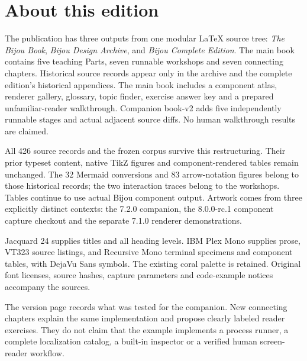 \chapter*{About this edition}

The publication has three outputs from one modular LaTeX source tree: \textit{The Bijou Book}, \textit{Bijou Design Archive}, and \textit{Bijou Complete Edition}. The main book contains five teaching Parts, seven runnable workshops and seven connecting chapters. Historical source records appear only in the archive and the complete edition's historical appendices. The main book includes a component atlas, renderer gallery, glossary, topic finder, exercise answer key and a prepared unfamiliar-reader walkthrough. Companion book-v2 adds five independently runnable stages and actual adjacent source diffs. No human walkthrough results are claimed.

All 426 source records and the frozen corpus survive this restructuring. Their prior typeset content, native TikZ figures and component-rendered tables remain unchanged. The 32 Mermaid conversions and 83 arrow-notation figures belong to those historical records; the two interaction traces belong to the workshops. Tables continue to use actual Bijou component output. Artwork comes from three explicitly distinct contexts: the 7.2.0 companion, the 8.0.0-rc.1 component capture checkout and the separate 7.1.0 renderer demonstrations.

Jacquard 24 supplies titles and all heading levels. IBM Plex Mono supplies prose, VT323 source listings, and Recursive Mono terminal specimens and component tables, with DejaVu Sans symbols. The existing coral palette is retained. Original font licenses, source hashes, capture parameters and code-example notices accompany the sources.

The version page records what was tested for the companion. New connecting chapters explain the same implementation and propose clearly labeled reader exercises. They do not claim that the example implements a process runner, a complete localization catalog, a built-in inspector or a verified human screen-reader workflow.
